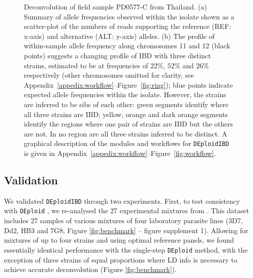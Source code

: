 \documentclass[9pt,lineno]{elife}
\begin{document}
\begin{figure}[ht]
  \centering{}
   \caption{Deconvolution of field sample PD0577-C from Thailand.  (a) Summary of allele frequencies observed within the isolate shown as a scatter-plot of the numbers of reads supporting the reference (REF: x-axis) and alternative (ALT: y-axis) alleles. (b) The profile of within-sample allele frequency along chromosomes 11 and 12 (black points) suggests a changing profile of IBD with three distinct strains, estimated to be at frequencies of $22\%$, $52\%$ and $26\%$ respectively (other chromosomes omitted for clarity, see Appendix~\ref{appedix:workflow}--Figure~\ref{fig:ring}); blue points indicate expected allele frequencies within the isolate.  However, the strains are inferred to be sibs of each other: green segments identify where all three strains are IBD; yellow, orange and dark orange segments identify the regions where one pair of strains are IBD but the others are not.  In no region are all three strains inferred to be distinct. A graphical description of the modules and workflows for \texttt{DEploidIBD} is given in Appendix~\ref{appedix:workflow}--Figure~\ref{fig:workflow}.}\label{fig:fig1}
\end{figure}


\subsection{Validation}

We validated \texttt{DEploidIBD} through two experiments.  First, to test consistency with \texttt{DEploid} \citet{Zhu2017}, we re-analysed the 27 experimental mixtures from \citep{Wendler2015}.  This dataset includes 27 samples of various mixtures of four laboratory parasite lines (3D7, Dd2, HB3 and 7G8; Figure \ref{fig:benchmark} – figure supplement 1).  Allowing for mixtures of up to four strains and using optimal reference panels, we found essentially identical performance with the single-step \texttt{DEploid} method, with the exception of three strains of equal proportions where LD info is necessary to achieve accurate deconvolution (Figure \ref{fig:benchmark}).  
\end{document}
